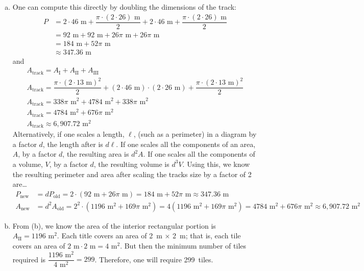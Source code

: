 \documentclass[11pt,letterpaper]{article}
\begin{document}
\begin{enumerate}[(a)]
\item One can compute this directly by doubling the dimensions of the track:
	\[
	\begin{aligned}
	P&= 2 \cdot 46 \text{ m} + \dfrac{\pi \cdot (2 \cdot 26) \text{ m}}{2} + 2 \cdot 46 \text{ m} + \dfrac{\pi \cdot (2 \cdot 26) \text{ m}}{2} \\
	&= 92 \text{ m} + 92 \text{ m} + 26\pi \text{ m} + 26\pi \text{ m} \\
	&= 184 \text{ m} + 52 \pi \text{ m} \\
	&\approx 347.36 \text{ m}
	\end{aligned}
	\]
and
	\[
	\begin{gathered}
	A_{\text{track}}= A_{\text{I}} + A_{\text{II}} + A_{\text{III}} \\
	A_{\text{track}}= \dfrac{\pi \cdot (2 \cdot 13 \text{ m})^2}{2} + (2 \cdot 46 \text{ m}) \cdot (2 \cdot 26 \text{ m}) + \dfrac{\pi \cdot (2 \cdot 13 \text{ m})^2}{2} \\
	A_{\text{track}}= 338\pi \text{ m}^2 + 4784 \text{ m}^2 + 338\pi \text{ m}^2 \\
	A_{\text{track}}= 4784 \text{ m}^2 + 676 \pi \text{ m}^2 \\
	A_{\text{track}} \approx 6,\!907.72 \text{ m}^2
	\end{gathered}
	\]
Alternatively, if one scales a length, $\ell$, (such as a perimeter) in a diagram by a factor $d$, the length after is $d \ell$. If one scales all the components of an area, $A$, by a factor $d$, the resulting area is $d^2 A$. If one scales all the components of a volume, $V$, by a factor $d$, the resulting volume is $d^3V$. Using this, we know the resulting perimeter and area after scaling the tracks size by a factor of 2 are\dots
	\[
	\begin{aligned}
	P_{\text{new}}&= dP_{\text{old}}= 2 \cdot (92 \text{ m} + 26 \pi \text{ m})= 184 \text{ m} + 52 \pi \text{ m} \approx 347.36 \text{ m} \\[0.3cm]
	A_{\text{new}}&= d^2 A_{\text{old}}= 2^2 \cdot (1196 \text{ m}^2 + 169 \pi \text{ m}^2)= 4(1196 \text{ m}^2 + 169 \pi \text{ m}^2)= 4784 \text{ m}^2 + 676 \pi \text{ m}^2 \approx 6,\!907.72 \text{ m}^2
	\end{aligned}
	\] \pspace

\item From (b), we know the area of the interior rectangular portion is $A_{\text{II}}= 1196 \text{ m}^2$. Each title covers an area of 2~m $\times$ 2~m; that is, each tile covers an area of $2 \text{ m} \cdot 2 \text{ m}= 4 \text{ m}^2$. But then the minimum number of tiles required is $\dfrac{1196 \text{ m}^2}{4 \text{ m}^2}= 299$. Therefore, one will require 299~tiles. 
\end{enumerate}
\end{document}
